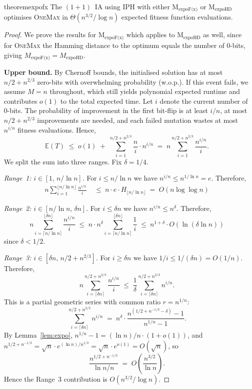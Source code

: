 \documentclass[lettersize,journal]{IEEEtran}
\newcommand{\EE}{\mathbb{E}}
\newcommand{\oneoneIA}{$(1+1)$~IA}
\newcommand{\expoF}{M$_{\text{expoF(x)}}$}
\newcommand{\expoHD}{M$_{\text{expoHD}}$}
\begin{document}
\begin{restatable}{theorem}{expofx} \label{cor:omexpohd}
The {\oneoneIA } using IPH with either {\expoF } or {\expoHD } optimises \textsc{OneMax} in $\Theta(n^{3/2}/\log n)$ expected fitness function evaluations.
\end{restatable}

\begin{proof}
We prove the results for \expoF{} which applies to \expoHD{} as well, since for \textsc{OneMax} the Hamming distance to the optimum equals the number of 0-bits, giving $M_{\text{expoF(x)}}=M_{\text{expoHD}}$.

\medskip
\noindent\textbf{Upper bound.}
By Chernoff bounds, the initialised solution has at most $n/2+n^{2/3}$ zero-bits with overwhelming probability (w.o.p.). If this event fails, we assume $M=n$ throughout, which still yields polynomial expected runtime and contributes $o(1)$ to the total expected time. Let $i$ denote the current number of 0-bits. The probability of improvement in the first bit-flip is at least $i/n$, at most $n/2+n^{2/3}$ improvements are needed, and each failed mutation wastes at most $n^{i/n}$ fitness evaluations. Hence,
\[
\EE(T) \;\leq\; o(1) \;+\; \sum_{i=1}^{n/2+n^{2/3}} \frac{n}{i}\cdot n^{i/n}
\;=\; n\sum_{i=1}^{n/2+n^{2/3}} \frac{n^{i/n}}{i}.
\]
We split the sum into three ranges. Fix $\delta=1/4$.

\emph{Range~1: $i\in[1,\,n/\ln n]$.}
For $i\leq n/\ln n$ we have $n^{i/n}\leq n^{1/\ln n}=e$.
Therefore,
\begin{align*}
n\sum_{i=1}^{\lfloor n/\ln n\rfloor}\frac{n^{i/n}}{i}
\;&\leq\; n\cdot e\cdot H_{\lfloor n/\ln n\rfloor}
\;=\; O(n\log\log n)
\end{align*}


\emph{Range~2: $i\in[n/\ln n,\,\delta n]$.}
For $i\leq \delta n$ we have $n^{i/n}\leq n^{\delta}$.
Therefore,
\[
n\sum_{i=\lceil n/\ln n\rceil}^{\lfloor\delta n\rfloor}\frac{n^{i/n}}{i}
\;\leq\; n\cdot n^{\delta}\sum_{i=\lceil n/\ln n\rceil}^{\lfloor\delta n\rfloor}\frac{1}{i}
\;\leq\; n^{1+\delta}\cdot O(\ln(\delta\ln n))
\]
since $\delta<1/2$.

\emph{Range~3: $i\in[\delta n,\,n/2+n^{2/3}]$.}
For $i\geq \delta n$ we have $1/i\leq 1/(\delta n)=O(1/n)$.
Therefore,
\[
n\sum_{i=\lceil\delta n\rceil}^{n/2+n^{2/3}}\frac{n^{i/n}}{i}
\;\leq\; \frac{1}{\delta}\sum_{i=\lceil\delta n\rceil}^{n/2+n^{2/3}} n^{i/n}.
\]
This is a partial geometric series with common ratio $r=n^{1/n}$:
\[
\sum_{i=\lceil\delta n\rceil}^{n/2+n^{2/3}} n^{i/n}
\;=\; n^{\delta}\cdot\frac{n^{(1/2+n^{-1/3}-\delta)}-1}{n^{1/n}-1}.
\]
By Lemma~\ref{lem:expo}, $n^{1/n}-1=(\ln n)/n\cdot(1+o(1))$, and $n^{1/2+n^{-1/3}}=\sqrt{n}\cdot e^{(\ln n)/n^{1/3}}=\sqrt{n}\cdot e^{o(1)}=O(\sqrt{n})$, so
\[
\frac{n^{1/2+n^{-1/3}}}{\ln n/n}
\;=\; O\!\left(\frac{n^{3/2}}{\ln n}\right).
\]
Hence the Range~3 contribution is $O(n^{3/2}/\log n)$.


\end{proof}
\end{document}
